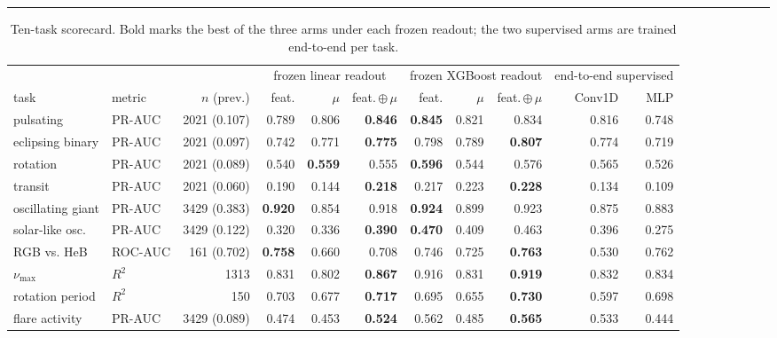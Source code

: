 \documentclass{article}
\begin{document}
\noindent\rule{\linewidth}{0.4pt}\par{}
\begin{table}[h]\caption{Ten-task scorecard. Bold marks the best of the three arms under each frozen readout; the two supervised arms are trained end-to-end per task.}
\centering\scriptsize
\setlength{\tabcolsep}{4pt}
\begin{tabular}{llrrrrrrrrr}
\toprule
 & & & \multicolumn{3}{c}{frozen linear readout} & \multicolumn{3}{c}{frozen XGBoost readout} & \multicolumn{2}{c}{end-to-end supervised} \\
\cmidrule(lr){4-6}\cmidrule(lr){7-9}\cmidrule(lr){10-11}
task & metric & $n$ (prev.) & feat. & $\mu$ & feat.\,$\oplus$\,$\mu$ & feat. & $\mu$ & feat.\,$\oplus$\,$\mu$ & Conv1D & MLP \\
\midrule
pulsating & PR-AUC & 2021 (0.107) & 0.789 & 0.806 & \textbf{0.846} & \textbf{0.845} & 0.821 & 0.834 & 0.816 & 0.748 \\
eclipsing binary & PR-AUC & 2021 (0.097) & 0.742 & 0.771 & \textbf{0.775} & 0.798 & 0.789 & \textbf{0.807} & 0.774 & 0.719 \\
rotation & PR-AUC & 2021 (0.089) & 0.540 & \textbf{0.559} & 0.555 & \textbf{0.596} & 0.544 & 0.576 & 0.565 & 0.526 \\
transit & PR-AUC & 2021 (0.060) & 0.190 & 0.144 & \textbf{0.218} & 0.217 & 0.223 & \textbf{0.228} & 0.134 & 0.109 \\
oscillating giant & PR-AUC & 3429 (0.383) & \textbf{0.920} & 0.854 & 0.918 & \textbf{0.924} & 0.899 & 0.923 & 0.875 & 0.883 \\
solar-like osc. & PR-AUC & 3429 (0.122) & 0.320 & 0.336 & \textbf{0.390} & \textbf{0.470} & 0.409 & 0.463 & 0.396 & 0.275 \\
RGB vs. HeB & ROC-AUC & 161 (0.702) & \textbf{0.758} & 0.660 & 0.708 & 0.746 & 0.725 & \textbf{0.763} & 0.530 & 0.762 \\
$\nu_{\max}$ & $R^2$ & 1313 & 0.831 & 0.802 & \textbf{0.867} & 0.916 & 0.831 & \textbf{0.919} & 0.832 & 0.834 \\
rotation period & $R^2$ & 150 & 0.703 & 0.677 & \textbf{0.717} & 0.695 & 0.655 & \textbf{0.730} & 0.597 & 0.698 \\
flare activity & PR-AUC & 3429 (0.089) & 0.474 & 0.453 & \textbf{0.524} & 0.562 & 0.485 & \textbf{0.565} & 0.533 & 0.444 \\
\bottomrule
\end{tabular}
\end{table}
\end{document}
